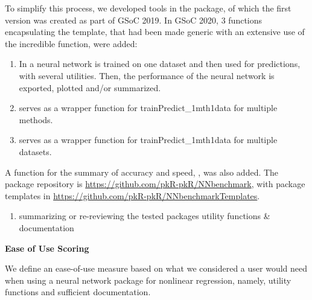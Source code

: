 To simplify this process, we developed tools in the 
package, of which the first version was created as part of GSoC 2019. In
GSoC 2020, 3 functions encapsulating the template, that had been made
generic with an extensive use of the incredible  function,
were added:

\begin{enumerate}
\def\labelenumi{\arabic{enumi}.}
\tightlist
\item
  In  a neural network is trained on one
  dataset and then used for predictions, with several utilities. Then,
  the performance of the neural network is exported, plotted and/or
  summarized.
\item
   serves as a wrapper function for
  trainPredict\_1mth1data for multiple methods.
\item
   serves as a wrapper function for
  trainPredict\_1mth1data for multiple datasets.
\end{enumerate}

A function for the summary of accuracy and speed, , was
also added. The package repository is
\url{https://github.com/pkR-pkR/NNbenchmark}, with package templates in
\url{https://github.com/pkR-pkR/NNbenchmarkTemplates}.

\begin{enumerate}
\def\labelenumi{\arabic{enumi}.}
\setcounter{enumi}{2}
\tightlist
\item
  summarizing or re-reviewing the tested packages utility functions \&
  documentation
\end{enumerate}

\textbf{Ease of Use Scoring}

We define an ease-of-use measure based on what we considered a user
would need when using a neural network package for nonlinear regression,
namely, utility functions and sufficient documentation.

